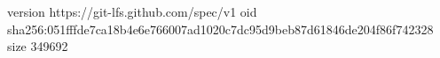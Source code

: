 version https://git-lfs.github.com/spec/v1
oid sha256:051fffde7ca18b4e6e766007ad1020c7dc95d9beb87d61846de204f86f742328
size 349692
